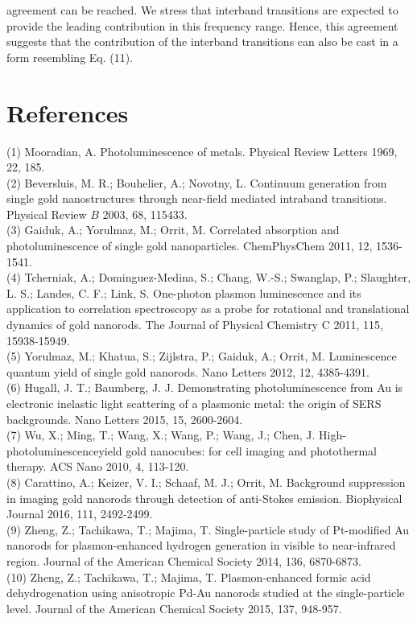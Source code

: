 \documentclass[10pt]{article}
\begin{document}
agreement can be reached. We stress that interband transitions are expected to provide the leading contribution in this frequency range. Hence, this agreement suggests that the contribution of the interband transitions can also be cast in a form resembling Eq. (11).

\section*{References}
(1) Mooradian, A. Photoluminescence of metals. Physical Review Letters 1969, 22, 185.\\
(2) Beversluis, M. R.; Bouhelier, A.; Novotny, L. Continuum generation from single gold nanostructures through near-field mediated intraband transitions. Physical Review $B$ 2003, 68, 115433.\\
(3) Gaiduk, A.; Yorulmaz, M.; Orrit, M. Correlated absorption and photoluminescence of single gold nanoparticles. ChemPhysChem 2011, 12, 1536-1541.\\
(4) Tcherniak, A.; Dominguez-Medina, S.; Chang, W.-S.; Swanglap, P.; Slaughter, L. S.; Landes, C. F.; Link, S. One-photon plasmon luminescence and its application to correlation spectroscopy as a probe for rotational and translational dynamics of gold nanorods. The Journal of Physical Chemistry C 2011, 115, 15938-15949.\\
(5) Yorulmaz, M.; Khatua, S.; Zijlstra, P.; Gaiduk, A.; Orrit, M. Luminescence quantum yield of single gold nanorods. Nano Letters 2012, 12, 4385-4391.\\
(6) Hugall, J. T.; Baumberg, J. J. Demonstrating photoluminescence from Au is electronic inelastic light scattering of a plasmonic metal: the origin of SERS backgrounds. Nano Letters 2015, 15, 2600-2604.\\
(7) Wu, X.; Ming, T.; Wang, X.; Wang, P.; Wang, J.; Chen, J. High-photoluminescenceyield gold nanocubes: for cell imaging and photothermal therapy. ACS Nano 2010, 4, 113-120.\\
(8) Carattino, A.; Keizer, V. I.; Schaaf, M. J.; Orrit, M. Background suppression in imaging gold nanorods through detection of anti-Stokes emission. Biophysical Journal 2016, 111, 2492-2499.\\
(9) Zheng, Z.; Tachikawa, T.; Majima, T. Single-particle study of Pt-modified Au nanorods for plasmon-enhanced hydrogen generation in visible to near-infrared region. Journal of the American Chemical Society 2014, 136, 6870-6873.\\
(10) Zheng, Z.; Tachikawa, T.; Majima, T. Plasmon-enhanced formic acid dehydrogenation using anisotropic Pd-Au nanorods studied at the single-particle level. Journal of the American Chemical Society 2015, 137, 948-957.\\
\end{document}
